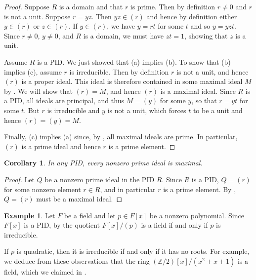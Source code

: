 \documentclass[12pt]{report}
\newtheorem{corollary}[theorem]{Corollary}
\numberwithin{equation}{section}
\numberwithin{theorem}{chapter}
\theoremstyle{definition}
\newtheorem{example}[theorem]{Example}
\newtheorem*{basic properties}{Basic Properties}
\newtheorem*{Important Remark}{Important Remark}
\newcommand{\Z}{\mathbb{Z}}
\begin{document}
\begin{proof} 
Suppose $R$ is a domain and that $r$ is prime. Then by definition $r \neq 0$ and $r$ is not a unit. Suppose $r = yz$. Then $yz \in (r)$ and hence by definition either $y \in (r)$ or $z \in (r)$. If $y \in (r)$, we have $y = rt$ for some $t$ and so $y = yzt$. Since $r \neq 0$, $y \neq 0$, and $R$ is a domain, we must have $zt = 1$, showing that $z$ is a unit.

Assume $R$ is a PID. We just showed that (a) implies (b).
To show that (b) implies (c), assume $r$ is irreducible. Then by definition $r$ is not a unit, and hence $(r)$ is a proper ideal. This ideal is therefore contained in some maximal ideal $M$ by . We will show that $(r)= M$, and hence $(r)$ is a maximal ideal.
Since $R$ is a PID, all ideals are principal, and thus $M = (y)$ for some $y$, so that $r = yt$ for some $t$. But $r$ is irreducible and $y$ is not a unit, which forces $t$ to be a unit and hence $(r) = (y) = M$.

Finally, (c) implies (a) since,
by , all maximal ideals are prime. In particular, $(r)$ is a prime ideal and hence $r$ is a prime element.
\end{proof}



\begin{corollary}\label{pid all nonzero primes are max}
In any PID, every nonzero prime ideal is maximal.
\end{corollary}

\begin{proof}
	Let $Q$ be a nonzero prime ideal in the PID $R$. Since $R$ is a PID, $Q = (r)$ for some nonzero element $r \in R$, and in particular $r$ is a prime element. By , $Q = (r)$ must be a maximal ideal.
\end{proof}



\begin{example} 
Let $F$ be a field and let $p \in F[x]$ be a nonzero polynomial. Since $F[x]$ is a PID, by  the quotient $F[x]/(p)$ is a field if and only if $p$ is irreducible.

If $p$ is quadratic, then it is irreducible if and only if it has no roots. 
For example, we deduce from these observations that the ring $(\Z/2)[x]/(x^2+x+1)$ is a field, which we claimed in .
\end{example}
\end{document}
